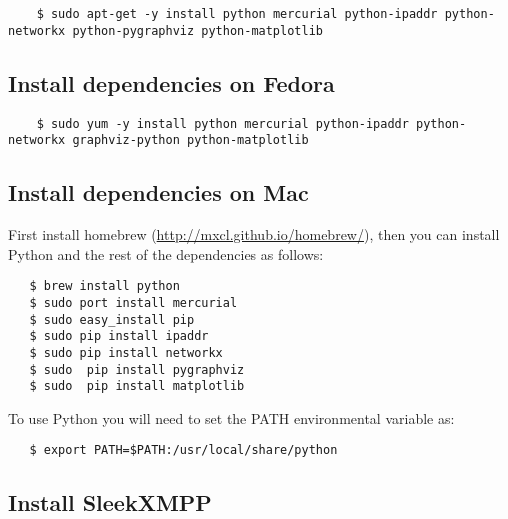 \begingroup
    \fontsize{10pt}{12pt}\selectfont

\begin{verbatim}
    $ sudo apt-get -y install python mercurial python-ipaddr python-networkx python-pygraphviz python-matplotlib
\end{verbatim}

\endgroup

\subsection{Install dependencies on Fedora}

\begingroup
    \fontsize{10pt}{12pt}\selectfont

\begin{verbatim}
    $ sudo yum -y install python mercurial python-ipaddr python-networkx graphviz-python python-matplotlib
\end{verbatim}

\endgroup

\subsection{Install dependencies on Mac}

First install homebrew (\url{http://mxcl.github.io/homebrew/}),
then you can install Python and the rest of the dependencies as follows:

\begingroup
    \fontsize{10pt}{12pt}\selectfont

\begin{verbatim}
   $ brew install python
   $ sudo port install mercurial
   $ sudo easy_install pip
   $ sudo pip install ipaddr
   $ sudo pip install networkx
   $ sudo  pip install pygraphviz
   $ sudo  pip install matplotlib
\end{verbatim}

\endgroup

To use Python you will need to set the PATH environmental variable as:

\begingroup
    \fontsize{10pt}{12pt}\selectfont

\begin{verbatim}
   $ export PATH=$PATH:/usr/local/share/python
\end{verbatim}

\endgroup

\subsection{Install SleekXMPP}

